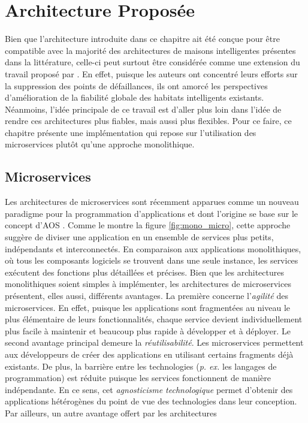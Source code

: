 \section{Architecture Proposée}

Bien que l'architecture introduite dans ce chapitre ait été conçue pour être compatible avec la majorité des architectures de maisons intelligentes présentes dans la littérature, celle-ci peut surtout être considérée comme une extension du travail proposé par \cite{Plantevin2018}. En effet, puisque les auteurs ont concentré leurs efforts sur la suppression des points de défaillances, ils ont amorcé les perspectives d'amélioration de la fiabilité globale des habitats intelligents existants. Néanmoins, l'idée principale de ce travail est d'aller plus loin dans l'idée de rendre ces architectures plus fiables, mais aussi plus flexibles. Pour ce faire, ce chapitre présente une implémentation qui repose sur l'utilisation des microservices plutôt qu'une approche monolithique.

\subsection{Microservices}

Les architectures de microservices sont récemment apparues comme un nouveau paradigme pour la programmation d'applications \citep{Dragoni2017} et dont l'origine se base sur le concept d'\ac{AOS} \citep{MacKenzie2006}. Comme le montre la figure \ref{fig:mono_micro}, cette approche suggère de diviser une application en un ensemble de services plus petits, indépendants et interconnectés. En comparaison aux applications monolithiques, où tous les composants logiciels se trouvent dans une seule instance, les services exécutent des fonctions plus détaillées et précises. Bien que les architectures monolithiques soient simples à implémenter, les architectures de microservices présentent, elles aussi, différents avantages. La première concerne l'\emph{agilité} des microservices. En effet, puisque les applications sont fragmentées au niveau le plus élémentaire de leurs fonctionnalités, chaque service devient individuellement plus facile à maintenir et beaucoup plus rapide à développer et à déployer. Le second avantage principal demeure la \emph{réutilisabilité}. Les microservices permettent aux développeurs de créer des applications en utilisant certains fragments déjà existants. De plus, la barrière entre les technologies (\textit{p. ex.} les langages de programmation) est réduite puisque les services fonctionnent de manière indépendante. En ce sens, cet \emph{agnosticisme technologique} permet d'obtenir des applications hétérogènes du point de vue des technologies dans leur conception. Par ailleurs, un autre avantage offert par les architectures

